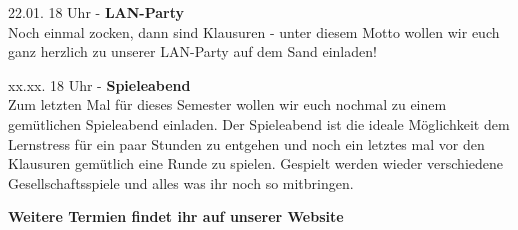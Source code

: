 \large 22.01. 18 Uhr - \textbf{LAN-Party}\\
\normalsize
Noch einmal zocken, dann sind Klausuren - unter diesem Motto wollen wir euch ganz herzlich zu unserer LAN-Party auf dem Sand einladen!\\

\large xx.xx. 18 Uhr - \textbf{Spieleabend}\\
\normalsize
Zum letzten Mal für dieses Semester wollen wir euch nochmal zu einem gemütlichen Spieleabend einladen. Der Spieleabend ist die ideale Möglichkeit dem Lernstress für ein paar Stunden zu entgehen und noch ein letztes mal vor den Klausuren gemütlich eine Runde zu spielen. Gespielt werden wieder verschiedene Gesellschaftsspiele und alles was ihr noch so mitbringen.

\large \textbf{Weitere Termien findet ihr auf unserer Website}